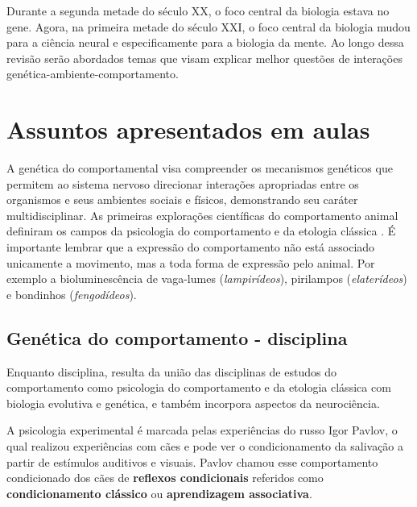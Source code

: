 \documentclass[
	article,			%
	12pt,				%
	oneside,			%
	a4paper,			%
	english,			%
	brazil,				%
	sumario=tradicional
	]{abntex2}
\begin{document}
Durante a segunda metade do século XX, o foco central da biologia estava no gene. Agora, na primeira metade do século XXI, o foco central da biologia mudou para a ciência neural e especificamente para a biologia da mente.
\cite{kandel2000principles} Ao longo dessa revisão serão abordados temas que visam explicar melhor questões de interações genética-ambiente-comportamento.
\section{Assuntos apresentados em aulas}
\label{aulas}
A genética do comportamental visa compreender os mecanismos genéticos que permitem ao sistema nervoso direcionar interações apropriadas entre os organismos e seus ambientes sociais e físicos, demonstrando seu caráter multidisciplinar.
As primeiras explorações científicas do comportamento animal definiram os campos da  psicologia do comportamento e da etologia clássica \cite{anholt2009principles}.
É importante lembrar que a expressão do comportamento não está associado unicamente a movimento, mas a toda forma de expressão pelo animal. Por exemplo a bioluminescência de vaga-lumes (\textit{lampirídeos}), pirilampos (\textit{elaterídeos}) e bondinhos (\textit{fengodídeos}).

\subsection{Genética do comportamento - disciplina}
Enquanto disciplina, resulta da união das disciplinas de estudos do comportamento como  psicologia do comportamento e da etologia clássica com biologia evolutiva e genética, e também incorpora aspectos da neurociência.

A psicologia experimental é marcada pelas experiências do russo Igor Pavlov, o qual realizou experiências com cães e pode ver o condicionamento da salivação a partir de estímulos auditivos e visuais. Pavlov chamou esse comportamento condicionado dos cães de \textbf{reflexos condicionais} referidos como \textbf{condicionamento clássico} ou \textbf{aprendizagem associativa}.
\end{document}
